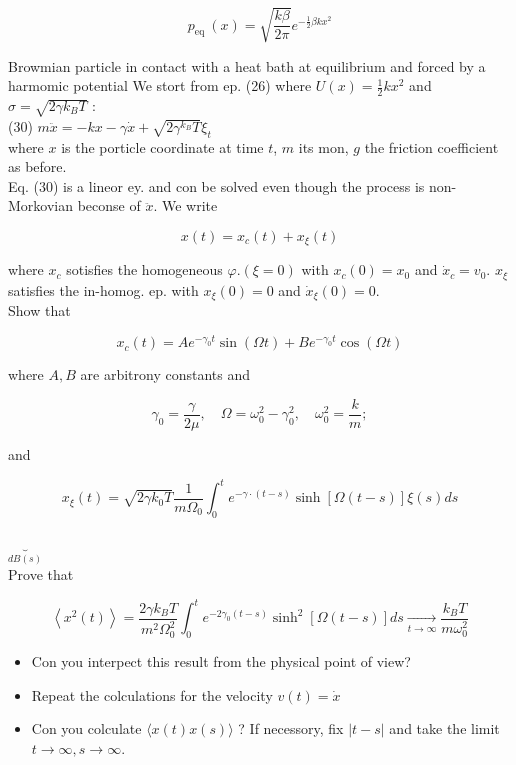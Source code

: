 \documentclass[10pt]{article}
\begin{document}
$$
p_{\text {eq }}(x)=\sqrt{\frac{k \beta}{2 \pi}} e^{-\frac{1}{2} \beta k x^{2}}
$$

Browmian particle in contact with a heat bath at equilibrium and forced by a harmomic potential We stort from ep. (26) where $U(x)=\frac{1}{2} k x^{2}$ and $\sigma=\sqrt{2 \gamma k_{B} T}$ :\\
(30) $m \ddot{x}=-k x-\gamma \dot{x}+\sqrt{2 \gamma^{k_{B}} T} \xi_{t}$\\
where $x$ is the porticle coordinate at time $t$, $m$ its mon, $g$ the friction coefficient as before.\\
Eq. (30) is a lineor ey. and con be solved even though the process is non-Morkovian beconse of $\ddot{x}$. We write

$$
x(t)=x_{c}(t)+x_{\xi}(t)
$$

where $x_{c}$ sotisfies the homogeneous $\varphi .(\xi=0)$ with $x_{c}(0)=x_{0}$ and $\dot{x}_{c}=v_{0}$. $x_{\xi}$ satisfies the in-homog. ep. with $x_{\xi}(0)=0$ and $\dot{x}_{\xi}(0)=0$.\\
Show that

$$
x_{c}(t)=A e^{-\gamma_{0} t} \sin (\Omega t)+B e^{-\gamma_{0} t} \cos (\Omega t)
$$

where $A, B$ are arbitrony constants and

$$
\gamma_{0}=\frac{\gamma}{2 \mu}, \quad \Omega=\omega_{0}^{2}-\gamma_{0}^{2}, \quad \omega_{0}^{2}=\frac{k}{m} ;
$$

and

$$
x_{\xi}(t)=\sqrt{2 \gamma k_{0} T} \frac{1}{m \Omega_{0}} \int_{0}^{t} e^{-\gamma \cdot(t-s)} \sinh [\Omega(t-s)] \xi(s) d s
$$

$\underbrace{}_{d B(s)}$\\
Prove that

$$
\left\langle x^{2}(t)\right\rangle=\frac{2 \gamma k_{B} T}{m^{2} \Omega_{0}^{2}} \int_{0}^{t} e^{-2 \gamma_{0}(t-s)} \sinh ^{2}[\Omega(t-s)] d s \underset{t \rightarrow \infty}{\longrightarrow} \frac{k_{B} T}{m \omega_{0}^{2}}
$$

\begin{itemize}
  \item Con you interpect this result from the physical point of view?
  \item Repeat the colculations for the velocity $v(t)=\dot{x}$
  \item Con you colculate $\langle x(t) x(s)\rangle$ ? If necessory, fix $|t-s|$ and take the limit $t \rightarrow \infty, s \rightarrow \infty$.
\end{itemize}
\end{document}
